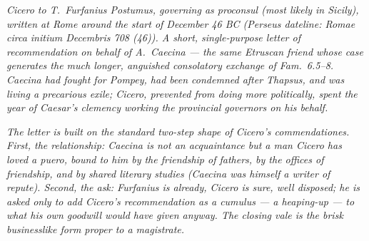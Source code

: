 
\textit{Cicero to T.~Furfanius Postumus, governing as proconsul (most
likely in Sicily), written at Rome around the start of December 46
BC (Perseus dateline: \textit{Romae circa initium Decembris 708
(46)}). A short, single-purpose letter of recommendation on behalf
of A.~Caecina --- the same Etruscan friend whose case generates the
much longer, anguished consolatory exchange of \textit{Fam.}~6.5--8.
Caecina had fought for Pompey, had been condemned after Thapsus, and
was living a precarious exile; Cicero, prevented from doing more
politically, spent the year of Caesar's clemency working the
provincial governors on his behalf.}

\textit{The letter is built on the standard two-step shape of
Cicero's commendationes. First, the relationship: Caecina is not an
acquaintance but a man Cicero has loved \textit{a puero}, bound to
him by the friendship of fathers, by the offices of friendship, and
by shared literary studies (Caecina was himself a writer of repute).
Second, the ask: Furfanius is already, Cicero is sure, well
disposed; he is asked only to add Cicero's recommendation as a
\textit{cumulus} --- a heaping-up --- to what his own goodwill would
have given anyway. The closing \textit{vale} is the brisk
businesslike form proper to a magistrate.}
